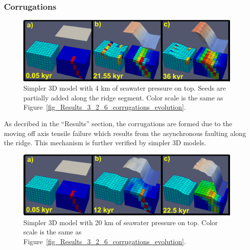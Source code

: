 \subsubsection{Corrugations}

\begin{figure}[h]
  \centering
    \includegraphics[width=1.0\textwidth]{./Figures/fig_Discussion_Observation_6_Corrugation_simplerModel_4kwaterdepth.eps}
  \caption[Simpler 3D model with 4 km of seawater pressure on top.]{Simpler 3D model with 4 km of seawater pressure on top. Seeds are partially added along the ridge segment. Color scale is the same as Figure~\hyperref[fig_Results_3_2_6_corrugations_evolution]{\ref{fig_Results_3_2_6_corrugations_evolution}}.}
 \label{fig_Discussion_Observation_6_Corrugation_simplerModel_4kwaterdepth}
\end{figure}   
As decribed in the ``Results'' section, the corrugations are formed due to the moving off axis tensile failure which results from the asynchronous faulting along the ridge. This mechanism is further verified by simpler 3D models.

\begin{figure}[h]
  \centering
    \includegraphics[width=1.0\textwidth]{./Figures/fig_Discussion_Observation_6_Corrugation_simplerModel_20kwaterdepth.eps}
  \caption[Simpler 3D model with 20 km of seawater pressure on top.]{Simpler 3D model with 20 km of seawater pressure on top. Color scale is the same as Figure~\hyperref[fig_Results_3_2_6_corrugations_evolution]{\ref{fig_Results_3_2_6_corrugations_evolution}}.}
 \label{fig_Discussion_Observation_6_Corrugation_simplerModel_20kwaterdepth}
\end{figure}

